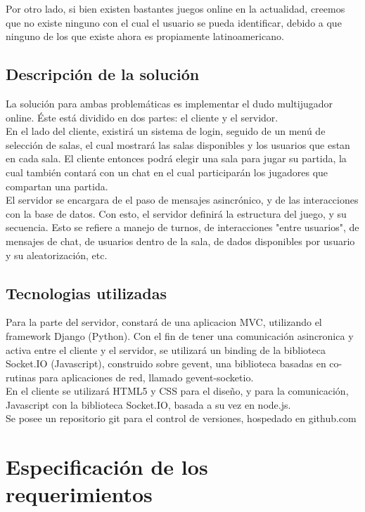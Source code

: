 \documentclass[a4paper,11pt]{article}
\begin{document}
	Por otro lado, si bien existen bastantes juegos online en la actualidad,
creemos que no existe ninguno con el cual el usuario se pueda identificar,
debido a que ninguno de los que existe ahora es propiamente latinoamericano. 

\subsection{Descripción de la solución}
	
	La solución para ambas problemáticas es implementar el dudo 
multijugador online. Éste está dividido en dos partes: el cliente y el servidor.
\\

	En el lado del cliente, existirá un sistema de login, seguido de un 
menú de selección de salas, el cual mostrará las salas disponibles y los 
usuarios que estan en cada sala. El cliente entonces podrá elegir una sala 
para jugar su partida, la cual también contará con un chat en el cual 
participarán los jugadores que compartan una partida.\\

	El servidor se encargara de el paso de mensajes asincrónico, y de las
interacciones con la base de datos. Con esto, el servidor definirá la 
estructura del juego, y su secuencia. Esto se refiere a manejo de turnos, 
de interacciones "entre usuarios", de mensajes de chat, de usuarios dentro de 
la sala, de dados disponibles por usuario y su aleatorización, etc.
	

\subsection{Tecnologias utilizadas}
Para la parte del servidor, constará de una aplicacion MVC, utilizando el framework
Django (Python). Con el fin de tener una comunicación asincronica y activa entre
el cliente y el servidor, se utilizará un binding de la biblioteca Socket.IO (Javascript),
construido sobre gevent, una biblioteca basadas en co-rutinas para aplicaciones de red, llamado
gevent-socketio.\\

En el cliente se utilizará HTML5 y CSS para el diseño, y para la comunicación, Javascript
con la biblioteca Socket.IO, basada a su vez en node.js.\\

Se posee un repositorio git para el control de versiones, hospedado en github.com

\newpage
\section{Especificación de los requerimientos}
	
\end{document}
